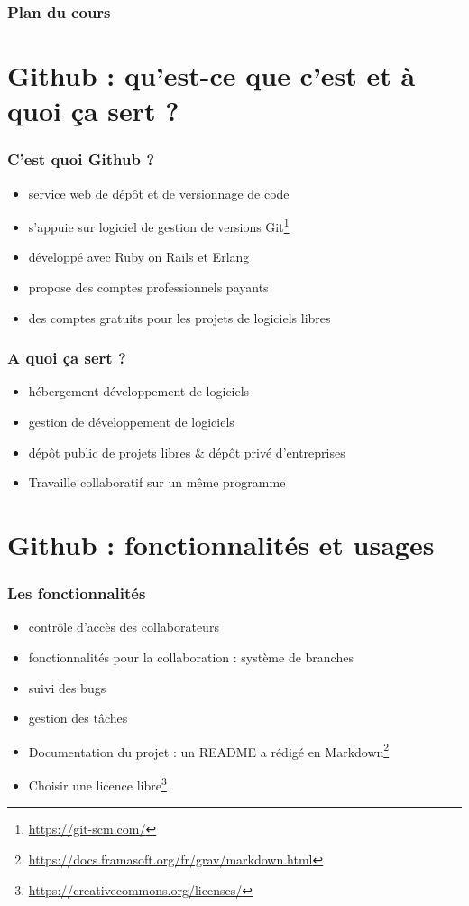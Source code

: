 \begin{frame}
  \frametitle{Plan du cours}
\tableofcontents

\end{frame}


\section{Github : qu'est-ce que c'est et à quoi ça sert ?}
\begin{frame}
  \frametitle{C'est quoi Github ?}
\begin{itemize}
\item {} service web de dépôt et de versionnage de code
\item {} s'appuie sur logiciel de gestion de versions Git\footnote{\url{https://git-scm.com/}}
\item {} développé avec Ruby on Rails et Erlang
\item {} propose des comptes professionnels payants
\item {} des comptes gratuits pour les projets de logiciels libres

\end{itemize}

\end{frame}


\begin{frame}
  \frametitle{A quoi ça sert ?}
\begin{itemize}
\item {} hébergement développement de logiciels
\item {} gestion de développement de logiciels
\item {} dépôt public de projets libres \& dépôt privé d'entreprises
\item {} Travaille collaboratif sur un même programme
\end{itemize}
\end{frame}

\section{Github : fonctionnalités et usages}
\begin{frame}
  \frametitle{Les fonctionnalités}
\begin{itemize}
\item {} contrôle d'accès des collaborateurs
\item {} fonctionnalités pour la collaboration : système de branches
\item {} suivi des bugs
\item {} gestion des tâches 
\item {} Documentation du projet : un README a rédigé en Markdown\footnote{\url{https://docs.framasoft.org/fr/grav/markdown.html}}
\item {} Choisir une licence libre\footnote{\url{https://creativecommons.org/licenses/}}
\end{itemize}
\end{frame}

